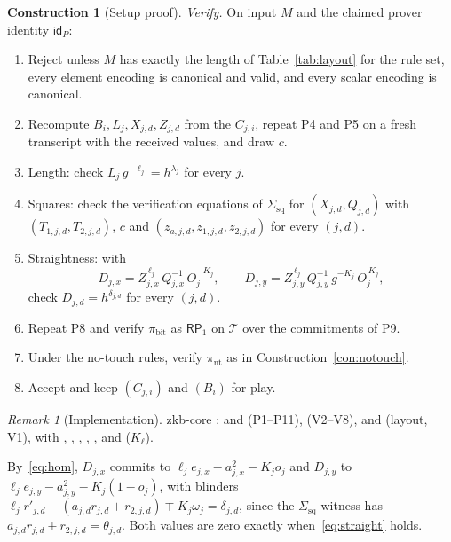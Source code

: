 \documentclass[11pt]{article}
\theoremstyle{definition}
\newtheorem{construction}[lemma]{Construction}
\theoremstyle{remark}
\newtheorem{remark}[lemma]{Remark}
\newcommand{\id}{\mathsf{id}}
\newcommand{\RP}{\mathsf{RP}}
\newcommand{\Sq}{\Sigma_{\mathrm{sq}}}
\newcommand{\tr}{\mathcal{T}}
\begin{document}
\begin{construction}[Setup proof]
\emph{Verify.} On input $M$ and the claimed prover identity $\id_P$:
\begin{enumerate}[label=V\arabic*.]
  \item\label{step:V1} Reject unless $M$ has exactly the length of Table~\ref{tab:layout} for the rule set, every element encoding is canonical and valid, and every scalar encoding is canonical.
  \item\label{step:V2} Recompute $B_i,L_j,X_{j,d},Z_{j,d}$ from the $C_{j,i}$, repeat P4 and P5 on a fresh transcript with the received values, and draw $c$.
  \item\label{step:V3} Length: check $L_j\,g^{-\ell_j}=h^{\lambda_j}$ for every $j$.
  \item\label{step:V4} Squares: check the verification equations of $\Sq$ for $(X_{j,d},Q_{j,d})$ with $(T_{1,j,d},T_{2,j,d})$, $c$ and $(z_{a,j,d},z_{1,j,d},z_{2,j,d})$ for every $(j,d)$.
  \item\label{step:V5} Straightness: with
  \[
    D_{j,x}=Z_{j,x}^{\,\ell_j}\,Q_{j,x}^{-1}\,O_j^{-K_j},\qquad
    D_{j,y}=Z_{j,y}^{\,\ell_j}\,Q_{j,y}^{-1}\,g^{-K_j}\,O_j^{\,K_j},
  \]
  check $D_{j,d}=h^{\delta_{j,d}}$ for every $(j,d)$.
  \item\label{step:V6} Repeat P8 and verify $\pi_{\mathrm{bit}}$ as $\RP_1$ on $\tr$ over the commitments of P9.
  \item\label{step:V7} Under the no-touch rules, verify $\pi_{\mathrm{nt}}$ as in Construction~\ref{con:notouch}.
  \item\label{step:V8} Accept and keep $(C_{j,i})$ and $(B_i)$ for play.
\end{enumerate}
\end{construction}

\begin{remark}[Implementation]\label{rem:impl-setup}
zkb-core :  and  (P1--P11),  (V2--V8),  and  (layout, V1), with , , , , ,  and  ($K_\ell$).
\end{remark}

By~\eqref{eq:hom}, $D_{j,x}$ commits to $\ell_je_{j,x}-a_{j,x}^2-K_jo_j$ and $D_{j,y}$ to $\ell_je_{j,y}-a_{j,y}^2-K_j(1-o_j)$, with blinders $\ell_jr'_{j,d}-(a_{j,d}r_{j,d}+r_{2,j,d})\mp K_j\omega_j=\delta_{j,d}$, since the $\Sq$ witness has $a_{j,d}r_{j,d}+r_{2,j,d}=\theta_{j,d}$. Both values are zero exactly when~\eqref{eq:straight} holds.
\end{document}
